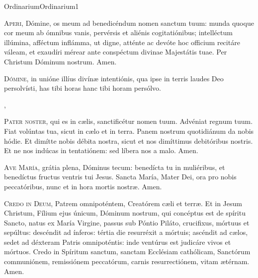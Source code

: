 \documentclass[psalterium-dominicis.tex]{subfiles}
\begin{document}
	{Ordinarium}{Ordinarium}{1}{}{}{}{}{}{}


\begin{multicols}{2}
\lettrine{A}{peri}, Dómine, os meum ad benedicéndum nomen sanctum tuum:
munda quoque cor meum ab ómnibus vanis, pervérsis et aliénis cogitatiónibus; 
intelléctum illúmina, afféctum inflámma, ut digne, atténte ac devóte
hoc officium recitáre váleam, et exaudíri mérear
ante conspéctum divinae Majestátis tuae. Per Christum Dóminum nostrum. Amen.

\lettrine{D}{ómine}, in unióne illíus divínæ intentiónis,
qua ipse in terris laudes Deo persolvísti,
has tibi horas  hanc tibi horam\rubric{)} persólvo.
\end{multicols}

\sep

\begin{multicols}{2}
\lettrine{P}{ater noster}, qui es in cælis, sanctificétur nomen tuum.
Advéniat regnum tuum. Fiat volúntas tua, sicut in cælo et in terra.
Panem nostrum quotidiánum da nobis hódie.
Et dimítte nobis débita nostra, sicut et nos dimíttimus debitóribus nostris.
Et ne nos indúcas in tentatiónem: sed líbera nos a malo. Amen.

\lettrine{A}{ve María}, grátia plena, Dóminus tecum:
benedícta tu in muliéribus, et benedíctus fructus ventris tui Jesus.
Sancta María, Mater Dei, ora pro nobis peccatóribus,
nunc et in hora mortis nostræ. Amen.

\lettrine{C}{redo in Deum}, Patrem omnipoténtem, Creatórem cæli et terræ.
Et in Jesum Christum, Fílium ejus únicum, Dóminum nostrum,
qui concéptus est de spíritu Sancto, natus ex María Virgine,
passus sub Póntio Piláto, crucifixus, mórtuus et sepúltus:
descéndit ad ínferos: tértia die resurréxit a mórtuis;
ascéndit ad cælos, sedet ad déxteram Patris omnipoténtis:
inde ventúrus est judicáre vivos et mórtuos.
Credo in Spíritum sanctum, sanctam Ecclésiam cathólicam,
Sanctórum communiónem, remissiónem peccatórum,
carnis resurrectiónem, vitam ætérnam. Amen.
\end{multicols}

\pagebreak

\end{document}

